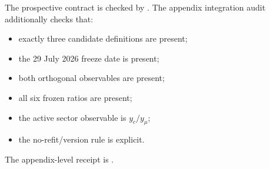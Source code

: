 The prospective contract is checked by
.
The appendix integration audit additionally checks that:
\begin{itemize}
\item exactly three candidate definitions are present;
\item the 29 July 2026 freeze date is present;
\item both orthogonal observables are present;
\item all six frozen ratios are present;
\item the active sector observable is \(y_c/y_\mu\);
\item the no-refit/version rule is explicit.
\end{itemize}

The appendix-level receipt is
.
